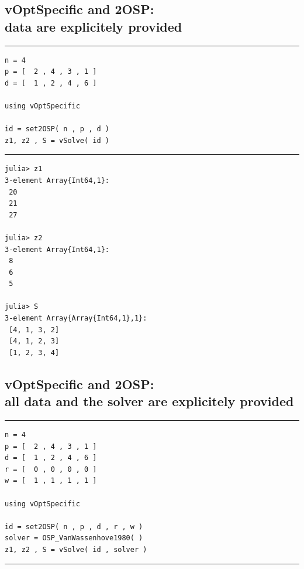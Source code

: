 \documentclass[11pt]{article}
\begin{document}
\subsection{vOptSpecific and 2OSP:\\ data are explicitely provided}

\vspace{5mm}  \vspace{2mm} \hrule

{%
\begin{lstlisting}
n = 4
p = [  2 , 4 , 3 , 1 ]
d = [  1 , 2 , 4 , 6 ]

using vOptSpecific

id = set2OSP( n , p , d )
z1, z2 , S = vSolve( id )
\end{lstlisting}
}
\vspace{5mm}  \vspace{2mm} \hrule

\begin{verbatim}
julia> z1
3-element Array{Int64,1}:
 20
 21
 27

julia> z2
3-element Array{Int64,1}:
 8
 6
 5

julia> S
3-element Array{Array{Int64,1},1}:
 [4, 1, 3, 2]
 [4, 1, 2, 3]
 [1, 2, 3, 4]
\end{verbatim}

\break

%
%
\subsection{vOptSpecific and 2OSP:\\ all data and the solver are explicitely provided}

\vspace{5mm}  \vspace{2mm} \hrule

{%
\begin{lstlisting}
n = 4
p = [  2 , 4 , 3 , 1 ]
d = [  1 , 2 , 4 , 6 ]
r = [  0 , 0 , 0 , 0 ]
w = [  1 , 1 , 1 , 1 ]

using vOptSpecific

id = set2OSP( n , p , d , r , w )
solver = OSP_VanWassenhove1980( )
z1, z2 , S = vSolve( id , solver )
\end{lstlisting}
}
\vspace{5mm}  \vspace{2mm} \hrule
\end{document}
